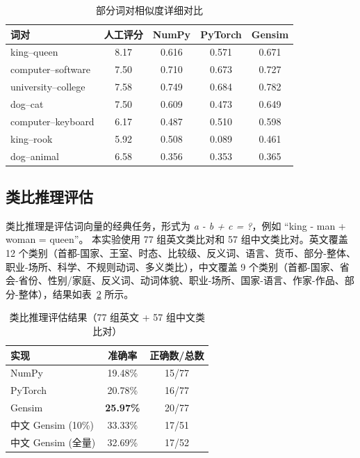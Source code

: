 \begin{table}[htbp]
\centering
\caption{部分词对相似度详细对比}
\label{tab:similarity_detail}
\begin{tabular}{lcccc}
\toprule
\textbf{词对} & \textbf{人工评分} & \textbf{NumPy} & \textbf{PyTorch} & \textbf{Gensim} \\
\midrule
king--queen & 8.17 & 0.616 & 0.571 & 0.671 \\
computer--software & 7.50 & 0.710 & 0.673 & 0.727 \\
university--college & 7.58 & 0.749 & 0.684 & 0.782 \\
dog--cat & 7.50 & 0.609 & 0.473 & 0.649 \\
computer--keyboard & 6.17 & 0.487 & 0.510 & 0.598 \\
king--rook & 5.92 & 0.508 & 0.089 & 0.461 \\
dog--animal & 6.58 & 0.356 & 0.353 & 0.365 \\
\bottomrule
\end{tabular}
\end{table}

\subsection{类比推理评估}

类比推理是评估词向量的经典任务，形式为 \textit{a - b + c = ?}，例如 ``king - man + woman = queen''。
本实验使用 77 组英文类比对和 57 组中文类比对。英文覆盖 12 个类别（首都-国家、王室、时态、比较级、反义词、语言、货币、部分-整体、职业-场所、科学、不规则动词、多义类比），中文覆盖 9 个类别（首都-国家、省会-省份、性别/家庭、反义词、动词体貌、职业-场所、国家-语言、作家-作品、部分-整体），结果如表~\ref{tab:analogy} 所示。

\begin{table}[htbp]
\centering
\caption{类比推理评估结果（77 组英文 + 57 组中文类比对）}
\label{tab:analogy}
\begin{tabular}{lcc}
\toprule
\textbf{实现} & \textbf{准确率} & \textbf{正确数/总数} \\
\midrule
NumPy & 19.48\% & 15/77 \\
PyTorch & 20.78\% & 16/77 \\
Gensim & \textbf{25.97\%} & 20/77 \\
中文 Gensim (10\%) & 33.33\% & 17/51 \\
中文 Gensim (全量) & 32.69\% & 17/52 \\
\bottomrule
\end{tabular}
\end{table}

